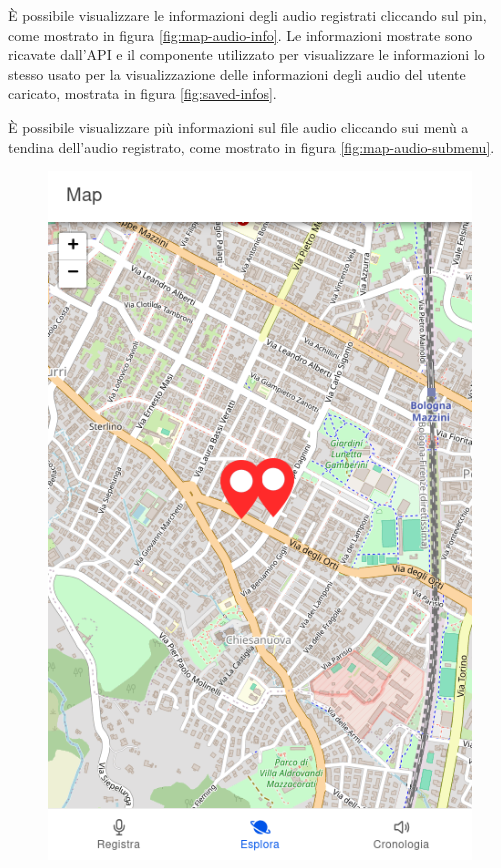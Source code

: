\documentclass{article}
\begin{document}
È possibile visualizzare le informazioni degli audio registrati cliccando sul pin, come mostrato in figura \ref{fig:map-audio-info}. Le informazioni mostrate sono ricavate dall'API e il componente utilizzato per visualizzare le informazioni lo stesso usato per la visualizzazione delle informazioni degli audio del utente caricato, mostrata in figura \ref{fig:saved-infos}.

È possibile visualizzare più informazioni sul file audio cliccando sui menù a tendina dell'audio registrato, come mostrato in figura \ref{fig:map-audio-submenu}.

\begin{figure}[H]
    \begin{minipage}{0.30\textwidth}
        \includegraphics[width=\linewidth]{map-pins.png}

\end{minipage}
\end{figure}
\end{document}
